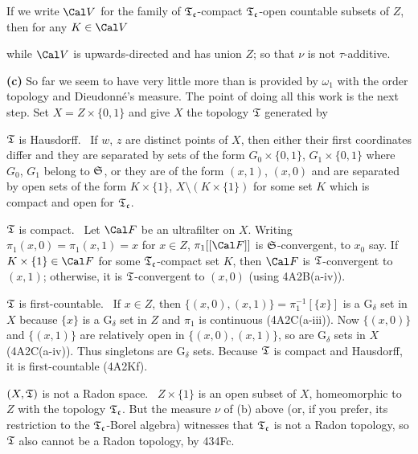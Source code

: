 {If we write $\Cal V$ for the family of $\frak T_{\frak c}$-compact
$\frak T_{\frak c}$-open countable subsets of $Z$, then for any
$K\in\Cal V$


\noindent while $\Cal V$ is upwards-directed and has union $Z$;  so that
$\nu$ is not $\tau$-additive.\ \Qed

\medskip

{\bf (c)} So far we seem to have very little more than is provided by
$\omega_1$ with the order topology and Dieudonn\'e's measure.   The
point of doing all this work is the next step.   Set
$X=Z\times\{0,1\}$ and give $X$ the topology $\frak T$ generated by


\medskip

 $\frak T$ is Hausdorff.   \Prf\ If $w$, $z$ are distinct
points of $X$, then either their first coordinates differ and they are
separated by sets of the form $G_0\times\{0,1\}$, $G_1\times\{0,1\}$
where $G_0$, $G_1$ belong to $\frak S$, or they are of the form $(x,1)$,
$(x,0)$ and are separated by open sets of the form $K\times\{1\}$,
$X\setminus(K\times\{1\})$ for some set $K$ which is compact and open
for $\frak T_{\frak c}$.\ \Qed

\medskip

 $\frak T$ is compact.   \Prf\ Let $\Cal F$ be an
ultrafilter on $X$.   Writing $\pi_1(x,0)=\pi_1(x,1)=x$ for $x\in Z$,
$\pi_1[[\Cal F]]$ is $\frak S$-convergent, to $x_0$ say.   If
$K\times\{1\}\in\Cal F$ for some $\frak T_{\frak c}$-compact set $K$,
then $\Cal F$ is $\frak T$-convergent to $(x,1)$;  otherwise, it is
$\frak T$-convergent to $(x,0)$ (using 4A2B(a-iv)).\ \Qed

\medskip

 $\frak T$ is first-countable.   \Prf\ If $x\in Z$,
then $\{(x,0),(x,1)\}=\pi_1^{-1}[\{x\}]$ is a G$_{\delta}$ set in $X$
because $\{x\}$ is a G$_{\delta}$ set in $Z$ and $\pi_1$ is
continuous (4A2C(a-iii)).   Now $\{(x,0)\}$ and $\{(x,1)\}$ are
relatively open in $\{(x,0),(x,1)\}$, so are G$_{\delta}$ sets in $X$
(4A2C(a-iv)).   Thus singletons are G$_\delta$ sets.   Because $\frak T$
is compact and Hausdorff, it is first-countable (4A2Kf).\ \Qed

\medskip

 $(X,\frak T)$ is not a Radon space.   \Prf\
$Z\times\{1\}$ is an open subset of $X$, homeomorphic to $Z$
with the topology $\frak T_{\frak c}$.   But the measure $\nu$ of (b)
above (or, if you prefer, its restriction to the
$\frak T_{\frak c}$-Borel
algebra) witnesses that $\frak T_{\frak c}$ is not a Radon topology, so
$\frak T$ also cannot be a Radon topology, by 434Fc.\ \Qed
}%


